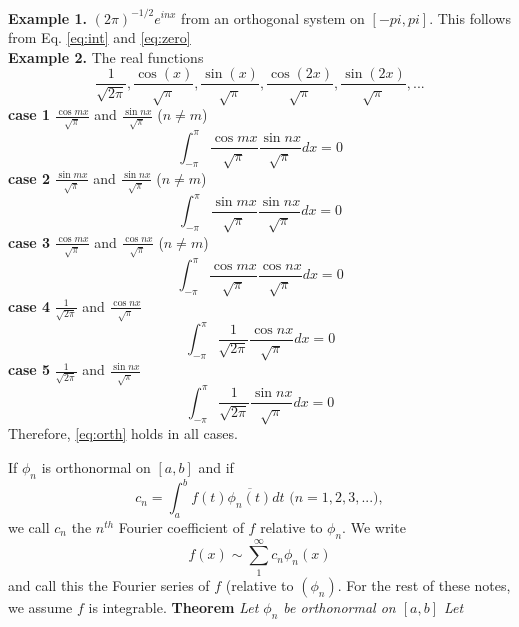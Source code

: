 \documentclass{article}
\begin{document}
\noindent \textbf{Example 1.}  $(2\pi)^{-{1/2}}e^{inx}$ from an orthogonal system on $[-pi,pi]$.  This follows from Eq. \ref{eq:int} and \ref{eq:zero}\\
\textbf{Example 2.} The real functions 
\begin{equation}
\frac{1}{\sqrt{2\pi}},\frac{\cos(x)}{\sqrt{\pi}},\frac{\sin(x)}{\sqrt{\pi}},\frac{\cos(2x)}{\sqrt{\pi}},\frac{\sin(2x)}{\sqrt{\pi}},...
\end{equation}
\textbf{case 1} $\frac{\cos mx}{\sqrt{\pi}}$ and $\frac{\sin nx}{\sqrt{\pi}}$ ($n\neq m$)
\begin{equation}
\int_{-\pi}^\pi \frac{\cos mx}{\sqrt{\pi}}\frac{\sin nx}{\sqrt{\pi}}dx = 0
\end{equation}
\textbf{case 2} $\frac{\sin mx}{\sqrt{\pi}}$ and $\frac{\sin nx}{\sqrt{\pi}}$ ($n\neq m$)
\begin{equation}
\int_{-\pi}^\pi \frac{\sin mx}{\sqrt{\pi}}\frac{\sin nx}{\sqrt{\pi}}dx = 0
\end{equation}
\textbf{case 3} $\frac{\cos mx}{\sqrt{\pi}}$ and $\frac{\cos nx}{\sqrt{\pi}}$ ($n\neq m$)
\begin{equation}
\int_{-\pi}^\pi \frac{\cos mx}{\sqrt{\pi}}\frac{\cos nx}{\sqrt{\pi}}dx = 0
\end{equation}
\textbf{case 4} $\frac{1}{\sqrt{2\pi}}$ and $\frac{\cos nx}{\sqrt{\pi}}$ 
\begin{equation}
\int_{-\pi}^\pi \frac{1}{\sqrt{2\pi}}\frac{\cos nx}{\sqrt{\pi}}dx = 0
\end{equation}
\textbf{case 5} $\frac{1}{\sqrt{2\pi}}$ and $\frac{\sin nx}{\sqrt{\pi}}$ 
\begin{equation}
\int_{-\pi}^\pi \frac{1}{\sqrt{2\pi}}\frac{\sin nx}{\sqrt{\pi}}dx = 0
\end{equation}
Therefore, \ref{eq:orth} holds in all cases.

If $\phi_n$ is orthonormal on $[a,b] $ and if\begin{equation}
c_n=\int_a^bf(t)\overline{\phi_n(t)}dt \text{ ($n=1,2,3,...$)},
\end{equation}
 we call $c_n$ the $n^{th} $ Fourier coefficient of $f$ relative to $\phi_n$.  We write 
\begin{equation}
f(x)\sim \sum_{1}^{\infty}c_n\phi_n(x)
\end{equation}
and call this the Fourier series of $f$ (relative to $(\phi_n)$.  For the rest of these notes, we assume $f$ is integrable.
\newpage
\textbf{Theorem} \emph{ Let $\phi_n$ be orthonormal on $[a,b]$ Let}
\end{document}
